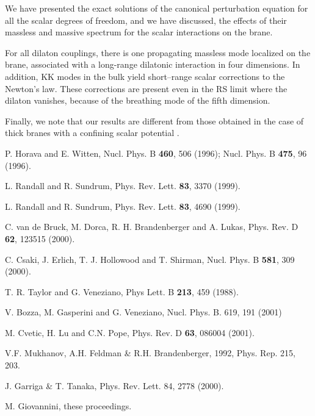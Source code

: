 \documentclass[a4paper,12pt]{article}
\begin{document}
We have presented the exact solutions of the canonical
perturbation equation for all the scalar degrees of freedom, and
we have discussed, the effects of their massless and massive
spectrum for the scalar interactions on the brane.

For all dilaton couplings, there is  one propagating massless mode
localized on the brane,  associated with a long-range dilatonic
interaction in four dimensions. In addition, KK modes in the bulk
yield short--range scalar corrections to the Newton's law. These
corrections are present even in the RS limit where the dilaton
vanishes, because of the breathing mode of the fifth dimension.

Finally, we note that our results are different from those
obtained in the case of thick branes with a confining scalar
potential \cite{Giovannini}.


\begin{thebibliography}{99}

P. Horava and E. Witten, Nucl. Phys. B {\bf 460}, 506
(1996); Nucl. Phys. B {\bf 475}, 96 (1996).

 L. Randall and R. Sundrum,  Phys. Rev. Lett. {\bf 83}, 3370 (1999).

 L. Randall and R. Sundrum,  Phys. Rev. Lett. {\bf 83},
4690  (1999).

 C. van de Bruck, M. Dorca, R. H. Brandenberger and A.
Lukas, Phys. Rev. D  {\bf 62}, 123515 (2000).

 C. Csaki, J. Erlich, T. J. Hollowood and T. Shirman, Nucl.
Phys. B {\bf 581}, 309 (2000).

 T. R. Taylor and G. Veneziano, Phys Lett. B {\bf 213}, 459
(1988).

 V. Bozza, M. Gasperini and G. Veneziano,
Nucl. Phys. B. 619, 191 (2001)

 M. Cvetic, H. Lu and C.N. Pope,
Phys. Rev. D {\bf 63}, 086004 (2001).

 V.F. Mukhanov, A.H. Feldman \& R.H. Brandenberger,
1992, Phys. Rep. 215, 203.

 J. Garriga \& T. Tanaka, Phys. Rev. Lett. 84,
2778 (2000).

 M. Giovannini, these proceedings.

\end{thebibliography}
\end{document}
